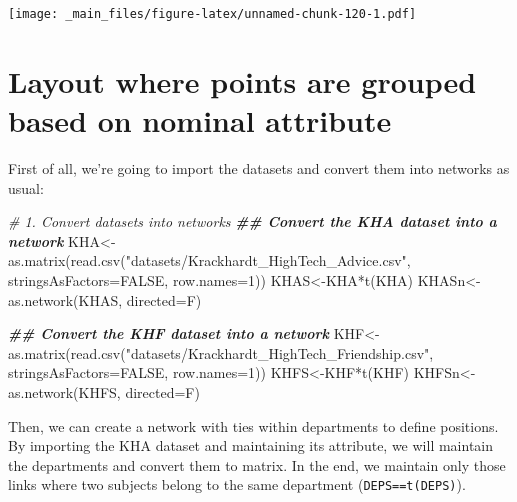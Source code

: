 \documentclass[
  notitlepage,
  onecolumn,
  openany]{book}
\newenvironment{Shaded}{\begin{snugshade}}{\end{snugshade}}
\newcommand{\AttributeTok}[1]{\textcolor[rgb]{0.77,0.63,0.00}{#1}}
\newcommand{\CommentTok}[1]{\textcolor[rgb]{0.56,0.35,0.01}{\textit{#1}}}
\newcommand{\ConstantTok}[1]{\textcolor[rgb]{0.00,0.00,0.00}{#1}}
\newcommand{\DecValTok}[1]{\textcolor[rgb]{0.00,0.00,0.81}{#1}}
\newcommand{\DocumentationTok}[1]{\textcolor[rgb]{0.56,0.35,0.01}{\textbf{\textit{#1}}}}
\newcommand{\FunctionTok}[1]{\textcolor[rgb]{0.00,0.00,0.00}{#1}}
\newcommand{\NormalTok}[1]{#1}
\newcommand{\OtherTok}[1]{\textcolor[rgb]{0.56,0.35,0.01}{#1}}
\newcommand{\SpecialCharTok}[1]{\textcolor[rgb]{0.00,0.00,0.00}{#1}}
\newcommand{\StringTok}[1]{\textcolor[rgb]{0.31,0.60,0.02}{#1}}
\begin{document}
\texttt{[image: \_main\_files/figure-latex/unnamed-chunk-120-1.pdf]}

\hypertarget{layout-where-points-are-grouped-based-on-nominal-attribute}{%
\section{Layout where points are grouped based on nominal attribute}\label{layout-where-points-are-grouped-based-on-nominal-attribute}}

First of all, we're going to import the datasets and convert them into networks as usual:

\begin{Shaded}
\begin{Highlighting}[]
\CommentTok{\# 1. Convert datasets into networks}
\DocumentationTok{\#\# Convert the KHA dataset into a network}
\NormalTok{KHA}\OtherTok{\textless{}{-}}\FunctionTok{as.matrix}\NormalTok{(}\FunctionTok{read.csv}\NormalTok{(}\StringTok{"datasets/Krackhardt\_HighTech\_Advice.csv"}\NormalTok{,}
                        \AttributeTok{stringsAsFactors=}\ConstantTok{FALSE}\NormalTok{, }\AttributeTok{row.names=}\DecValTok{1}\NormalTok{))}
\NormalTok{KHAS}\OtherTok{\textless{}{-}}\NormalTok{KHA}\SpecialCharTok{*}\FunctionTok{t}\NormalTok{(KHA)}
\NormalTok{KHASn}\OtherTok{\textless{}{-}}\FunctionTok{as.network}\NormalTok{(KHAS, }\AttributeTok{directed=}\NormalTok{F)}

\DocumentationTok{\#\# Convert the KHF dataset into a network}
\NormalTok{KHF}\OtherTok{\textless{}{-}}\FunctionTok{as.matrix}\NormalTok{(}\FunctionTok{read.csv}\NormalTok{(}\StringTok{"datasets/Krackhardt\_HighTech\_Friendship.csv"}\NormalTok{,}
                        \AttributeTok{stringsAsFactors=}\ConstantTok{FALSE}\NormalTok{, }\AttributeTok{row.names=}\DecValTok{1}\NormalTok{))}
\NormalTok{KHFS}\OtherTok{\textless{}{-}}\NormalTok{KHF}\SpecialCharTok{*}\FunctionTok{t}\NormalTok{(KHF)}
\NormalTok{KHFSn}\OtherTok{\textless{}{-}}\FunctionTok{as.network}\NormalTok{(KHFS, }\AttributeTok{directed=}\NormalTok{F)}
\end{Highlighting}
\end{Shaded}

Then, we can create a network with ties within departments to define positions. By importing the KHA dataset and maintaining its attribute, we will maintain the departments and convert them to matrix. In the end, we maintain only those links where two subjects belong to the same department (\texttt{DEPS==t(DEPS)}).
\end{document}
